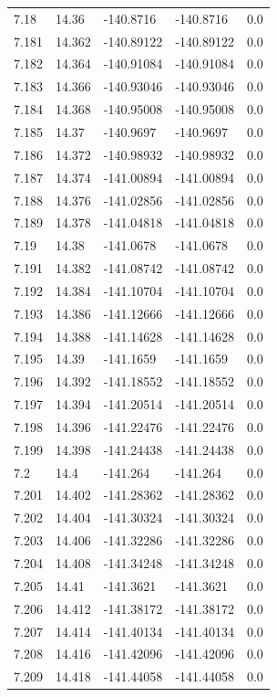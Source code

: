 \begin{tabular}{lllll}
7.18 & 14.36 & -140.8716 & -140.8716 & 0.0 \\
7.181 & 14.362 & -140.89122 & -140.89122 & 0.0 \\
7.182 & 14.364 & -140.91084 & -140.91084 & 0.0 \\
7.183 & 14.366 & -140.93046 & -140.93046 & 0.0 \\
7.184 & 14.368 & -140.95008 & -140.95008 & 0.0 \\
7.185 & 14.37 & -140.9697 & -140.9697 & 0.0 \\
7.186 & 14.372 & -140.98932 & -140.98932 & 0.0 \\
7.187 & 14.374 & -141.00894 & -141.00894 & 0.0 \\
7.188 & 14.376 & -141.02856 & -141.02856 & 0.0 \\
7.189 & 14.378 & -141.04818 & -141.04818 & 0.0 \\
7.19 & 14.38 & -141.0678 & -141.0678 & 0.0 \\
7.191 & 14.382 & -141.08742 & -141.08742 & 0.0 \\
7.192 & 14.384 & -141.10704 & -141.10704 & 0.0 \\
7.193 & 14.386 & -141.12666 & -141.12666 & 0.0 \\
7.194 & 14.388 & -141.14628 & -141.14628 & 0.0 \\
7.195 & 14.39 & -141.1659 & -141.1659 & 0.0 \\
7.196 & 14.392 & -141.18552 & -141.18552 & 0.0 \\
7.197 & 14.394 & -141.20514 & -141.20514 & 0.0 \\
7.198 & 14.396 & -141.22476 & -141.22476 & 0.0 \\
7.199 & 14.398 & -141.24438 & -141.24438 & 0.0 \\
7.2 & 14.4 & -141.264 & -141.264 & 0.0 \\
7.201 & 14.402 & -141.28362 & -141.28362 & 0.0 \\
7.202 & 14.404 & -141.30324 & -141.30324 & 0.0 \\
7.203 & 14.406 & -141.32286 & -141.32286 & 0.0 \\
7.204 & 14.408 & -141.34248 & -141.34248 & 0.0 \\
7.205 & 14.41 & -141.3621 & -141.3621 & 0.0 \\
7.206 & 14.412 & -141.38172 & -141.38172 & 0.0 \\
7.207 & 14.414 & -141.40134 & -141.40134 & 0.0 \\
7.208 & 14.416 & -141.42096 & -141.42096 & 0.0 \\
7.209 & 14.418 & -141.44058 & -141.44058 & 0.0 \\

\end{tabular}
